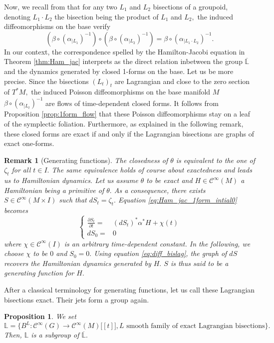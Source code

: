 \documentclass[a4paper,11pt]{article}
\newcommand{\func}[1]{\mathcal{C}^{\infty}(#1)}
\newtheorem{proposition}[theorem]{Proposition}
\newtheorem{remark}[theorem]{Remark}
\begin{document}
Now, we recall from \cite{Weinstein1987} that for any two $L_1$ and $L_2$ bisections of a groupoid, denoting $L_1 \cdot L_2$ the bisection being the product of $L_1$ and $L_2,$ the induced diffeomorphisms on the base verify
\begin{equation}\label{eq:comp_bislag}
\left(\beta \circ (\alpha_{|L_1})^{-1}\right) \circ \left(\beta \circ (\alpha_{|L_2})^{-1}\right) = \beta \circ (\alpha_{|L_1 \cdot L_2})^{-1}.
\end{equation} 
In our context, the correspondence spelled by the Hamilton-Jacobi equation in Theorem \ref{thm:Ham_jac} interprets as the direct relation inbetween the group $\overline{\mathbb{ L}}$ and the dynamics generated by closed 1-forms on the base. Let us be more precise. Since the bisections $(L_t)_t$ are Lagrangian and close to the zero section of $T^*M,$ the induced Poisson diffeomorphisms on the base manifold $M$ $\beta \circ \left( \alpha_{| L_t} \right)^{-1}$ are flows of time-dependent closed forms. It follows from Proposition \ref{prop:1form_flow} that these Poisson diffeomorphisms stay on a leaf of the symplectic foliation. Furthermore, as explained in the following remark, these closed forms are exact if and only if the Lagrangian bisections are graphs of exact one-forms. 

\begin{remark}[Generating functions]\label{rem:gen_func}
The closedness of $\theta$ is equivalent to the one of $\zeta_t$ for all $t \in I.$ The same equivalence holds of course about exactedness and leads us to Hamiltonian dynamics. Let us assume $\theta$ to be exact and $H \in \func{M}$ a Hamiltonian being a primitive of $\theta.$ As a consequence, there exists $S \in \func{M \times I}$ such that $dS_t = \zeta_t.$ Equation \eqref{eq:Ham_jac_1form_intial0} becomes
\begin{equation}\label{eq:Ham_jac_exact}
\left\{
\begin{array}{cc}
\frac{\partial S_t}{\partial t} =& (dS_t)^*\alpha^*H + \chi(t)\\
dS_0 =& 0
\end{array}
\right.
\end{equation}
where $\chi \in \func{I}$ is an arbitrary time-dependent constant. In the following, we choose $\chi$ to be $0$ and $S_0=0.$ Using equation \eqref{eq:diff_bislag}, the graph of $dS$ recovers the Hamiltonian dynamics generated by $H.$ $S$ is thus said to be a generating function for $H.$
\end{remark}

After a classical terminology for generating functions, let us call these Lagrangian bisections exact. Their jets form a group again.
\begin{proposition}\label{prop:subgroup_exact}
We set 
\[
\mathbb{L}  = \{ B^L \colon \func{G} \to \func{M} \bigl[ [t] \bigr], L \text{ smooth family of exact Lagrangian bisections} \}.
\]
Then, $\mathbb{L}$ is a subgroup of $\overline{\mathbb{L}}.$
\end{proposition}
\end{document}

